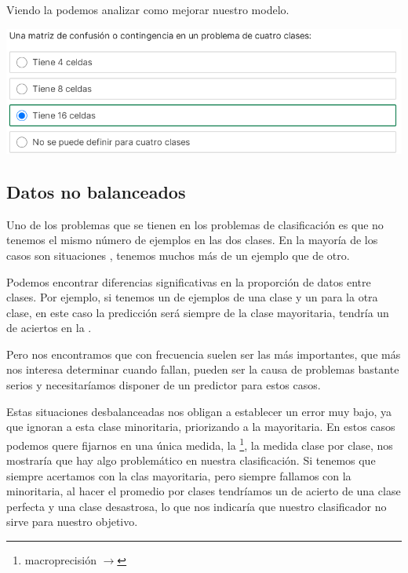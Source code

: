 Viendo la  podemos analizar como mejorar nuestro modelo.
\begin{center}
    \includegraphics[scale=.75]{images/mod02-14.png}
\end{center}

\subsection{Datos no balanceados}

Uno de los problemas que se tienen en los problemas de clasificación es que no tenemos el mismo número de ejemplos en las dos clases. En la mayoría de los casos son situaciones , tenemos muchos más de un ejemplo que de otro.

Podemos encontrar diferencias significativas en la proporción de datos entre clases. Por ejemplo, si tenemos un  de ejemplos de una clase y un  para la otra clase, en este caso la predicción será siempre de la clase mayoritaria, tendría un  de aciertos en la . 

Pero nos encontramos que con frecuencia  suelen ser las más importantes, que más nos interesa determinar cuando fallan, pueden ser la causa de problemas bastante serios y necesitaríamos disponer de un predictor para estos casos.

Estas situaciones desbalanceadas nos obligan a establecer un error muy bajo, ya que ignoran a esta clase minoritaria, priorizando a la mayoritaria. En estos casos podemos quere fijarnos en una única medida, la \footnote{macroprecisión $\rightarrow$ }, la medida clase por clase, nos mostraría que hay algo problemático en nuestra clasificación. Si tenemos que siempre acertamos con la clas mayoritaria, pero siempre fallamos con la minoritaria, al hacer el promedio por clases tendríamos un  de acierto de una clase perfecta y una clase desastrosa, lo que nos indicaría que nuestro clasificador no sirve para nuestro objetivo. 

